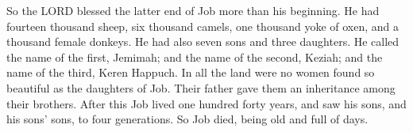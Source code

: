 \myverse{}So the LORD blessed the latter end of Job more than his beginning. He had fourteen thousand sheep, six thousand camels, one thousand yoke of oxen, and a thousand female donkeys. \myverse{}He had also seven sons and three daughters. \myverse{}He called the name of the first, Jemimah; and the name of the second, Keziah; and the name of the third, Keren Happuch. \myverse{}In all the land were no women found so beautiful as the daughters of Job. Their father gave them an inheritance among their brothers. \myverse{}After this Job lived one hundred forty years, and saw his sons, and his sons’ sons, to four generations. \myverse{}So Job died, being old and full of days.



